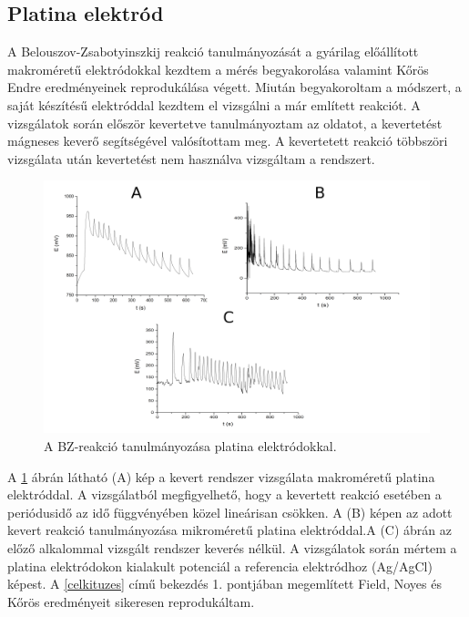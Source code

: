 \subsection{Platina elektród}
A Belouszov-Zsabotyinszkij reakció tanulmányozását a gyárilag előállított makroméretű elektródokkal kezdtem a mérés begyakorolása valamint Kőrös Endre eredményeinek \cite{noyes1972oscillations} reprodukálása végett. Miután begyakoroltam a módszert, a saját készítésű elektróddal kezdtem el vizsgálni a már említett reakciót. A vizsgálatok során először kevertetve tanulmányoztam az oldatot, a kevertetést mágneses keverő segítségével valósítottam meg. A kevertetett reakció többszöri vizsgálata után kevertetést nem használva vizsgáltam a rendszert.
\begin{figure}[h]
\centering
\includegraphics[width=1\textwidth]{img/platina_meres.png}
\caption{A BZ-reakció tanulmányozása platina elektródokkal.}
\label{fig:platina_meres}
\end{figure}
A \ref{fig:platina_meres} ábrán látható (A) kép a kevert rendszer vizsgálata makroméretű platina elektróddal. A vizsgálatból megfigyelhető, hogy a kevertett reakció esetében a periódusidő az idő függvényében közel lineárisan csökken. A (B) képen az adott kevert reakció tanulmányozása mikroméretű platina elektróddal.A (C) ábrán az előző alkalommal vizsgált rendszer keverés nélkül. A vizsgálatok során mértem a platina elektródokon kialakult potenciál a referencia elektródhoz (Ag/AgCl) képest. A \ref{celkituzes} című bekezdés 1. pontjában megemlített Field, Noyes és Kőrös eredményeit \cite{noyes1972oscillations} sikeresen reprodukáltam.  


